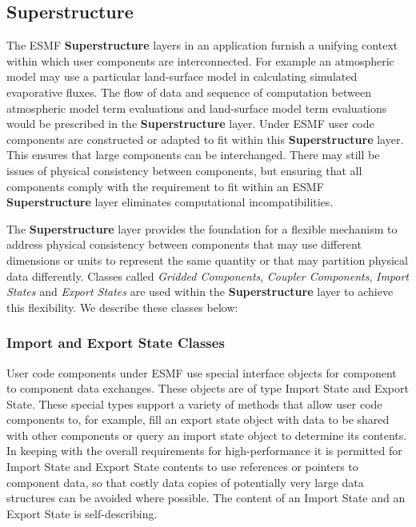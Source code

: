 
\subsection{Superstructure}
\label{sec:superstructure}
The ESMF {\bf Superstructure} layers in an application furnish a unifying context within which user components are interconnected. For 
example an atmospheric model may use a particular land-surface model in calculating simulated evaporative fluxes. 
The flow of data and sequence of computation between atmospheric model term evaluations and land-surface model
term evaluations would be prescribed in the {\bf Superstructure} layer. Under ESMF user code components are constructed or adapted
to fit within this {\bf Superstructure} layer. This ensures that large components can be interchanged. There may still be issues
of physical consistency between components, but ensuring that all components comply with the requirement to fit
within an ESMF {\bf Superstructure} layer eliminates computational incompatibilities. 

The {\bf Superstructure} layer provides
the foundation for a flexible mechanism to address physical consistency between components that may use different dimensions or units to represent the
same quantity or that may partition physical data differently. Classes called {\it Gridded Components}, 
{\it Coupler Components}, {\it Import States} and {\it Export States} are used within the {\bf Superstructure} layer
to achieve this flexibility.
We describe these classes below:

\subsubsection{Import and Export State Classes}
User code components under ESMF use special interface objects for component to component data exchanges. These objects are 
of type Import State and Export State. These special types support a variety of methods that allow user code components 
to, for example, fill an export state object with data to be shared with other components or query an import state object to 
determine its contents. In keeping with the overall requirements for high-performance it is permitted for Import State and
Export State contents to use references or pointers to component data, so that costly data copies of potentially
very large data structures can be avoided where possible. The content of an Import State and an Export State is 
self-describing.

